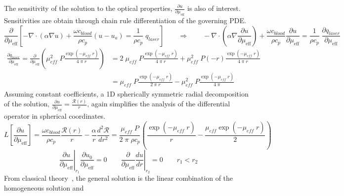 \documentclass{article}         %
\theoremstyle{definition}
\theoremstyle{remark}
\begin{document}
The sensitivity of the solution to the optical properties, $\frac{\partial
u}{\partial \mu_\text{eff}}$ is also of
interest.
Sensitivities are obtain through chain rule differentiation of the governing
PDE.
\[
\frac{\partial}{\partial \mu_\text{eff}}
\left[
 -\nabla \cdot \left(   \alpha \nabla u  \right) 
 + \frac{\omega c_\textit{blood}}{\rho c_p} (u  - u_a )
 = \frac{1}{\rho c_p} \; q_{laser}
\right]
\qquad
\Rightarrow
\qquad
 -\nabla \cdot  \left(   \alpha \nabla  \frac{\partial u}{\partial \mu_\text{eff}} \right) 
 + \frac{\omega c_\textit{blood}}{\rho c_p} \frac{\partial u}{\partial \mu_\text{eff}}  
 = \frac{1}{\rho c_p} \;
   \frac{\partial q_{laser}}{\partial \mu_\text{eff}}
\]
\[ \begin{split}
   \frac{\partial q_{laser}}{\partial \mu_\text{eff}}
   = 
   \frac{\partial }{\partial \mu_\text{eff}}
   \left(
    \mu_\textit{eff}^2 \;  P
    \frac{ \exp \left(-\mu_\textit{eff} \; r \right) }{ 4 \; \pi \; r}
   \right)
 & = 
   2 \; \mu_\textit{eff} \;  P
    \frac{ \exp \left(-\mu_\textit{eff} \; r \right) }{ 4 \; \pi \; r}
   + 
    \mu_\textit{eff}^2 \;  P
    \left(-r\right) \frac{ \exp \left(-\mu_\textit{eff} \; r \right) }{ 4 \; \pi \; r}
 \\
 & = 
    \mu_\textit{eff} \;  P
    \frac{ \exp \left(-\mu_\textit{eff} \; r \right) }{ 2 \; \pi \; r}
   - 
    \mu_\textit{eff}^2 \;  P
                    \frac{ \exp \left(-\mu_\textit{eff} \; r \right) }{ 4 \; \pi }
 \end{split}
\]
Assuming constant coefficients, 
a 1D spherically symmetric radial decomposition 
of the solution,
$ \frac{\partial u}{\partial \mu_\text{eff}} = \frac{\mathcal{R}(r)}{r}$, again simplifies the analysis of the differential operator in
spherical coordinates.
\[
   L \left[\frac{\partial u}{\partial \mu_\text{eff}}\right] = 
    \frac{\omega c_\textit{blood}}{\rho c_p}  \frac{ \mathcal{R}(r)}{r} 
   -
    \frac{\alpha }{r}   \frac{d^2 \mathcal{R}}{dr^2}
   = 
    \frac{\mu_\textit{eff} \;  P }{ 2 \; \pi \; \rho c_p}   
    \left(
    \frac{ \exp \left(-\mu_\textit{eff} \; r \right) }{  r}
   - 
    \frac{ \mu_\textit{eff} \exp \left(-\mu_\textit{eff} \; r \right) }{ 2 }
    \right)
\]
\[
 \left.
 \frac{\partial u}{\partial \mu_\text{eff}} 
  \right|_{r_1}
 \frac{\partial u_0}{\partial \mu_\text{eff}} = 0
  \qquad
  \left. \frac{\partial }{\partial \mu_\text{eff}}
   \frac{d u}{dr} \right|_{r_2}  = 0
  \qquad
   r_1 < r_2
\]
From classical theory~\cite{boyce1992elementary}, 
the general solution is the linear combination of the homogeneous solution and
\end{document}
